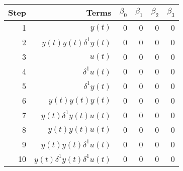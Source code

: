 \begin{tabular}{rrrrrr}
Step & Terms & $\beta_{0}$ & $\beta_{1}$ & $\beta_{2}$ & $\beta_{3}$ \\ 
\hline 
1 & $y(t)$ & 0 & 0 & 0 & 0 \\ 
2 & $y(t)y(t)\delta^1 y(t)$ & 0 & 0 & 0 & 0 \\ 
3 & $u(t)$ & 0 & 0 & 0 & 0 \\ 
4 & $\delta^1 u(t)$ & 0 & 0 & 0 & 0 \\ 
5 & $\delta^1 y(t)$ & 0 & 0 & 0 & 0 \\ 
6 & $y(t)y(t)y(t)$ & 0 & 0 & 0 & 0 \\ 
7 & $y(t)\delta^1 y(t)u(t)$ & 0 & 0 & 0 & 0 \\ 
8 & $y(t)y(t)u(t)$ & 0 & 0 & 0 & 0 \\ 
9 & $y(t)y(t)\delta^1 u(t)$ & 0 & 0 & 0 & 0 \\ 
10 & $y(t)\delta^1 y(t)\delta^1 u(t)$ & 0 & 0 & 0 & 0 \\ 
\hline 
\end{tabular}